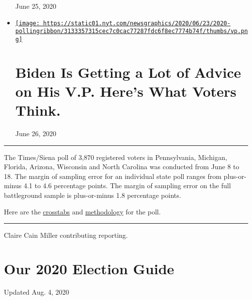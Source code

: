 \begin{itemize}
  June 25, 2020
\item
  \href{https://www.nytimes.com/2020/06/26/us/politics/biden-vice-president-voters.html}{\texttt{[image: https://static01.nyt.com/newsgraphics/2020/06/23/2020-pollingribbon/3133357315cec7c0cac77287fdc6f8ec7774b74f/thumbs/vp.png]}}

  \href{https://www.nytimes.com/2020/06/26/us/politics/biden-vice-president-voters.html}{}

  \hypertarget{biden-is-getting-a-lot-of-advice-on-his-vp-heres-what-voters-think}{%
  \section{Biden Is Getting a Lot of Advice on His V.P. Here's What
  Voters
  Think.}\label{biden-is-getting-a-lot-of-advice-on-his-vp-heres-what-voters-think}}

  June 26, 2020
\end{itemize}

\begin{center}\rule{0.5\linewidth}{\linethickness}\end{center}

The Times/Siena poll of 3,870 registered voters in Pennsylvania,
Michigan, Florida, Arizona, Wisconsin and North Carolina was conducted
from June 8 to 18. The margin of sampling error for an individual state
poll ranges from plus-or-minus 4.1 to 4.6 percentage points. The margin
of sampling error on the full battleground sample is plus-or-minus 1.8
percentage points.

Here are the
\href{https://int.nyt.com/data/documenttools/battleground-0625/6ca076db1919b722/full.pdf}{crosstabs}
and
\href{https://int.nyt.com/data/documenttools/nyt-siena-poll-methodology-june-2020/f6f533b4d07f4cbe/full.pdf}{methodology}
for the poll.

\begin{center}\rule{0.5\linewidth}{\linethickness}\end{center}

Claire Cain Miller contributing reporting.

\hypertarget{our-2020-election-guide}{%
\section{Our 2020 Election Guide}\label{our-2020-election-guide}}

Updated Aug. 4, 2020

